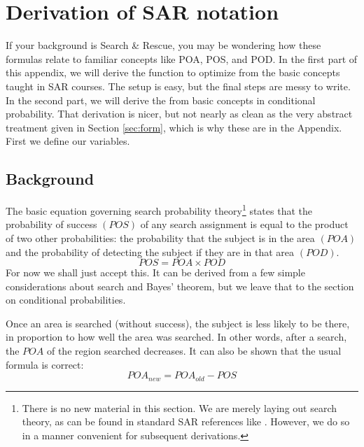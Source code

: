 
\section{Derivation of SAR notation}
\label{sec:terms}

If your background is Search \& Rescue, you may be wondering how these
formulas relate to familiar concepts like POA, POS, and POD.  In the
first part of this appendix, we will derive the function to optimize
from the basic concepts taught in SAR courses. The setup is easy, but
the final steps are messy to write.  In the second part, we will
derive the from basic concepts in conditional probability. That
derivation is nicer, but not nearly as clean as the very abstract
treatment given in Section \ref{sec:form}, which is why these are in
the Appendix. First we define our variables.

\subsection{Background}
\label{sec:Background}

The basic equation governing search probability theory\footnote{There
  is no new material in this section. We are merely laying out search
  theory, as can be found in standard SAR references like
  \cite{frost99:_principles, syrotuck75:_introduction,
    cooper00_adjpoa, cooper00_defs}. However, we
do so in a manner convenient for subsequent derivations.} states that the
probability of success $(POS)$ of any search assignment is equal to
the product of two other probabilities: the probability that the
subject is in the area $(POA)$ and the probability of detecting the
subject if they are in that area $(POD)$.
\begin{equation}
  \label{eq:POS}
  POS = POA \times POD
\end{equation}
For now we shall just accept this. It can be derived from a few simple
considerations about search and Bayes' theorem, but we leave that to
the section on conditional probabilities.

Once an area is searched (without
success), the subject is less likely to be there, in proportion to how 
well the area was searched. In other words, after a search, the $POA$ of 
the region searched decreases. It can also be shown that the usual
formula is correct:
\begin{equation}
  \label{eq:POA_new}
  POA_{new} = POA_{old} - POS
\end{equation}

